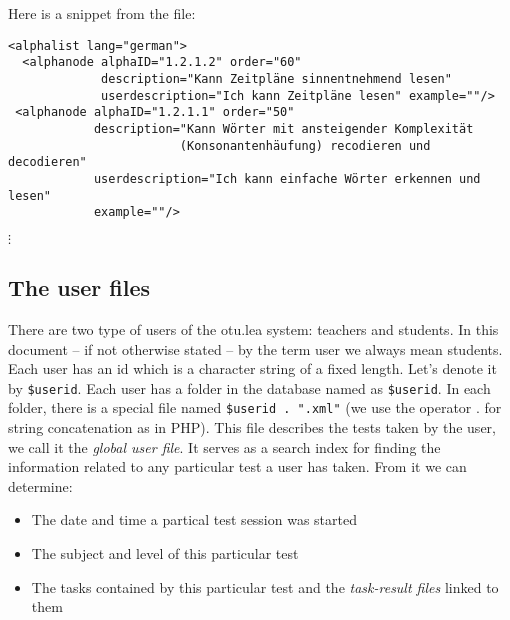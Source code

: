 \documentclass{scrartcl}
\begin{document}
Here is a snippet from the file:
\begin{verbatim}
<alphalist lang="german">
  <alphanode alphaID="1.2.1.2" order="60"
             description="Kann Zeitpläne sinnentnehmend lesen" 
             userdescription="Ich kann Zeitpläne lesen" example=""/>
 <alphanode alphaID="1.2.1.1" order="50" 
            description="Kann Wörter mit ansteigender Komplexität 
                        (Konsonantenhäufung) recodieren und decodieren" 
            userdescription="Ich kann einfache Wörter erkennen und lesen" 
            example=""/>
\end{verbatim}
\quad$\vdots$
\subsection{The user files}
There are two type of users of the otu.lea system: teachers and students. In this document -- if not otherwise stated -- by the term user we always mean students. Each user has an id which is a character string of a fixed length. Let's denote it by \verb+$userid+. Each user has a folder in the database named as \verb+$userid+. In each folder, there is a special file named \verb+$userid . ".xml"+ (we use the operator . for string concatenation as in PHP). This file describes the tests taken by the user, we call it the \emph{global user file}. It serves as a search index for finding the information related to any particular test a user has taken. From it we can determine:
\begin{itemize}
\item The date and time a partical test session was started
\item The subject and level of this particular test
\item The tasks contained by this particular test and the \emph{task-result files} linked to them
\end{itemize}
\end{document}
